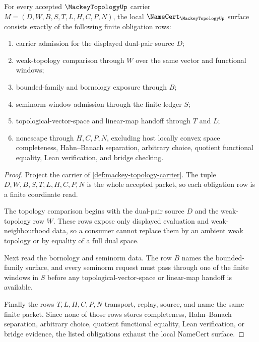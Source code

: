 \begin{theorem}
\label{thm:mackey-topology-namecert-obligations}
For every accepted $\MackeyTopologyUp$ carrier $M=(D,W,B,S,T,L,H,C,P,N)$, the local $\NameCert_{\MackeyTopologyUp}$ surface consists exactly of the following finite obligation rows:
\begin{enumerate}
\item carrier admission for the displayed dual-pair source $D$;
\item weak-topology comparison through $W$ over the same vector and functional windows;
\item bounded-family and bornology exposure through $B$;
\item seminorm-window admission through the finite ledger $S$;
\item topological-vector-space and linear-map handoff through $T$ and $L$;
\item nonescape through $H,C,P,N$, excluding host locally convex space completeness, Hahn--Banach separation, arbitrary choice, quotient functional equality, Lean verification, and bridge checking.
\end{enumerate}
\end{theorem}
\begin{proof}
Project the carrier of \autoref{def:mackey-topology-carrier}. The tuple $D,W,B,S,T,L,H,C,P,N$ is the whole accepted packet, so each obligation row is a finite coordinate read.

The topology comparison begins with the dual-pair source $D$ and the weak-topology row $W$. These rows expose only displayed evaluation and weak-neighbourhood data, so a consumer cannot replace them by an ambient weak topology or by equality of a full dual space.

Next read the bornology and seminorm data. The row $B$ names the bounded-family surface, and every seminorm request must pass through one of the finite windows in $S$ before any topological-vector-space or linear-map handoff is available.

Finally the rows $T,L,H,C,P,N$ transport, replay, source, and name the same finite packet. Since none of those rows stores completeness, Hahn--Banach separation, arbitrary choice, quotient functional equality, Lean verification, or bridge evidence, the listed obligations exhaust the local NameCert surface.
\end{proof}

